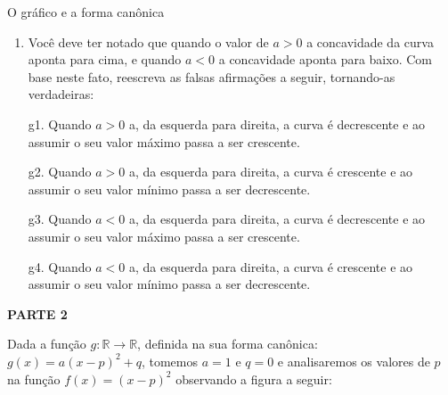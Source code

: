 \begin{task}{O gráfico e a forma canônica}
\begin{enumerate}
f1. A curva some, pois não é mais função.

f2. Não existe mais curva, o gráfico apresentado é uma reta representada pela função constante \(f:\mathbb{R}\to\mathbb{R}\) dado por \(f(x)=0\)

f3. A curva ainda existe mais fica invisível, pois a abertura de sua concavidade tende ao infinito.

f4. A curva se transforma numa reta que está sobreposta ao eixo das abscissas.

\item {} 
Você deve ter notado que quando o valor de \(a>0\) a concavidade da curva aponta para cima, e quando \(a<0\) a concavidade aponta para baixo. Com base neste fato, reescreva as falsas afirmações a seguir, tornando-as verdadeiras:

g1. Quando \(a>0\) a, da esquerda para direita, a curva é decrescente e ao assumir o seu valor máximo passa a ser crescente.

g2. Quando \(a>0\) a, da esquerda para direita, a curva é crescente e ao assumir o seu valor mínimo passa a ser decrescente.

g3. Quando \(a<0\) a, da esquerda para direita, a curva é decrescente e ao assumir o seu valor máximo passa a ser crescente.

g4. Quando \(a<0\) a, da esquerda para direita, a curva é crescente e ao assumir o seu valor mínimo passa a ser decrescente.

\end{enumerate}

\textbf{PARTE 2}

Dada a função \(g:\mathbb{R}\to\mathbb{R}\), definida na sua forma canônica: \(g(x)=a(x-p)^2+q\), tomemos \(a=1\) e \(q=0\) e analisaremos os valores de \(p\) na função \(f(x)=(x-p)^2\) observando a figura a seguir:
\begin{figure}[H]
\centering


\end{figure}
\end{task}
